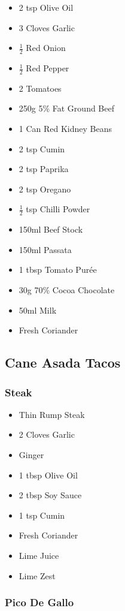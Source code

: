\documentclass[11pt, english]{article}
\begin{document}
	\begin{itemize}
	\setlength\itemsep{0cm}
		\item 2 tsp Olive Oil
		\item 3 Cloves Garlic
		\item $\frac{1}{2}$ Red Onion
		\item $\frac{1}{2}$ Red Pepper
		\item 2 Tomatoes
		\item 250g 5\% Fat Ground Beef
		\item 1 Can Red Kidney Beans
		\item 2 tsp Cumin
		\item 2 tsp Paprika
		\item 2 tsp Oregano
		\item $\frac{1}{2}$ tsp Chilli Powder
		\item 150ml Beef Stock
		\item 150ml Passata
		\item 1 tbsp Tomato Pur\'{e}e
		\item 30g 70\% Cocoa Chocolate
		\item 50ml Milk
		\item Fresh Coriander
	\end{itemize}

\newpage

	\subsection{Cane Asada Tacos}

		\subsubsection*{Steak}

	\begin{itemize}
        \setlength\itemsep{0cm}
		\item Thin Rump Steak
		\item 2 Cloves Garlic
		\item Ginger
		\item 1 tbsp Olive Oil
		\item 2 tbsp Soy Sauce
		\item 1 tsp Cumin
		\item Fresh Coriander
		\item Lime Juice
		\item Lime Zest
	\end{itemize}

		\subsubsection*{Pico De Gallo}
	
\end{document}
